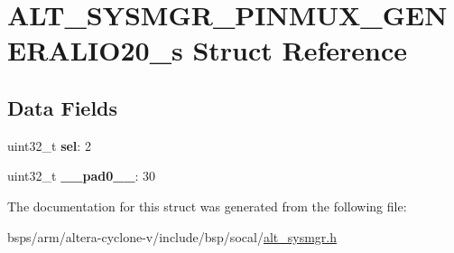 \hypertarget{structALT__SYSMGR__PINMUX__GENERALIO20__s}{}\section{A\+L\+T\+\_\+\+S\+Y\+S\+M\+G\+R\+\_\+\+P\+I\+N\+M\+U\+X\+\_\+\+G\+E\+N\+E\+R\+A\+L\+I\+O20\+\_\+s Struct Reference}
\label{structALT__SYSMGR__PINMUX__GENERALIO20__s}
\subsection*{Data Fields}
\begin{DoxyCompactItemize}
\item 
\mbox{\label{structALT__SYSMGR__PINMUX__GENERALIO20__s_ad06b12f3080ff9857da7f68d03dc61a9}} 
uint32\+\_\+t {\bfseries sel}\+: 2
\item 
\mbox{\label{structALT__SYSMGR__PINMUX__GENERALIO20__s_aa03e3940a8449153f4ed06f44a1a9b95}} 
uint32\+\_\+t {\bfseries \+\_\+\+\_\+pad0\+\_\+\+\_\+}\+: 30
\end{DoxyCompactItemize}


The documentation for this struct was generated from the following file\+:\begin{DoxyCompactItemize}
\item 
bsps/arm/altera-\/cyclone-\/v/include/bsp/socal/\mbox{\hyperlink{alt__sysmgr_8h}{alt\+\_\+sysmgr.\+h}}\end{DoxyCompactItemize}
